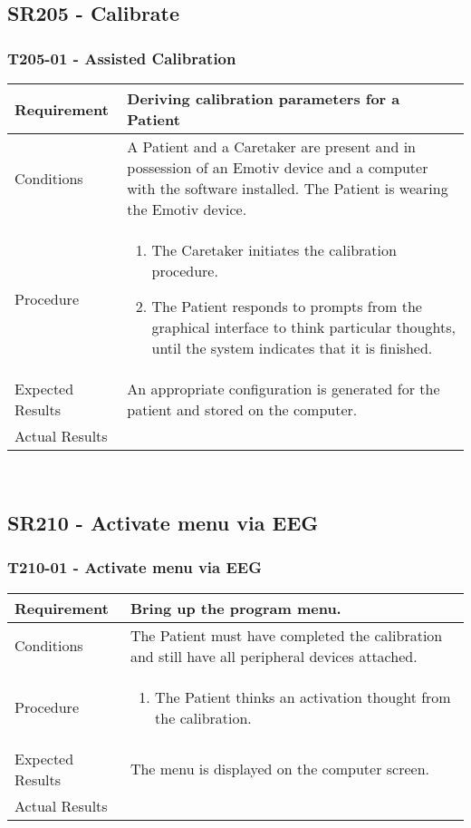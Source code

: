 \documentclass{article}
\begin{document}
\subsection{SR205 - Calibrate}
\subsubsection{T205-01 - Assisted Calibration}
\begin{tabular}{| l | p{12cm} |}
    \hline
	Requirement & Deriving calibration parameters for a Patient \\ \hline
	Conditions & A Patient and a Caretaker are present and in possession of an
	Emotiv device and a computer with the software installed. The Patient is
	wearing the Emotiv device. \\ \hline
    Procedure &
\begin{enumerate}
    \item The Caretaker initiates the calibration procedure.
    \item The Patient responds to prompts from the graphical interface to
        think particular thoughts, until the system indicates that it is
        finished.
\end{enumerate} \\ \hline
	Expected Results & An appropriate configuration is generated for the
patient and stored on the computer. \\ \hline
Actual Results & \vspace{1cm} \\ \hline
\end{tabular}

\hfill \\

\subsection{SR210 - Activate menu via EEG}
\subsubsection{T210-01 - Activate menu via EEG}
\begin{tabular}{| l | p{12cm} |}
    \hline
	Requirement & Bring up the program menu. \\ \hline
	Conditions & The Patient must have completed the calibration and still have all peripheral devices attached. \\ \hline
	Procedure & 
\begin{enumerate}
	\item The Patient thinks an activation thought from the calibration.
\end{enumerate} \\ \hline
	Expected Results & The menu is displayed on the computer screen. \\ \hline
	Actual Results & \vspace{1cm} \\ \hline
\end{tabular}
\end{document}
